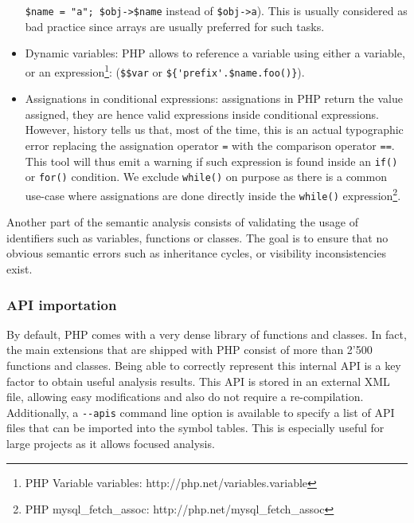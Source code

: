 \documentclass[a4paper]{article}
\begin{document}
\begin{itemize}
    \verb.$name = "a"; $obj->$name. instead of \verb.$obj->a.). This is usually
    considered as bad practice since arrays are usually preferred for such
    tasks.
  \item Dynamic variables: PHP allows to reference a variable using either a
    variable, or an expression\footnote{PHP Variable variables:
    http://php.net/variables.variable}: (\verb=$$var= or
    \verb=${'prefix'.$name.foo()}=).
  \item Assignations in conditional expressions: assignations in PHP return the
    value assigned, they are hence valid expressions inside conditional
    expressions. However, history tells us that, most of the time, this is an
    actual typographic error replacing the assignation operator \verb&=& with
    the comparison operator \verb&==&. This tool will thus emit a warning if
    such expression is found inside an \verb&if()& or \verb&for()& condition.
    We exclude \verb&while()& on purpose as there is a common use-case where
    assignations are done directly inside the \verb&while()&
    expression\footnote{PHP mysql\_fetch\_assoc:
    http://php.net/mysql\_fetch\_assoc}.
\end{itemize}

Another part of the semantic analysis consists of validating the usage of
identifiers such as variables, functions or classes. The goal is to ensure that
no obvious semantic errors such as inheritance cycles, or visibility
inconsistencies exist.

\subsubsection{API importation}
By default, PHP comes with a very dense library of functions and classes. In
fact, the main extensions that are shipped with PHP consist of more than 2'500
functions and classes. Being able to correctly represent this internal API is a
key factor to obtain useful analysis results. This API is stored in an external
XML file, allowing easy modifications and also do not require a re-compilation.
Additionally, a \verb=--apis= command line option is available to specify a
list of API files that can be imported into the symbol tables. This is
especially useful for large projects as it allows focused analysis.
\end{document}
